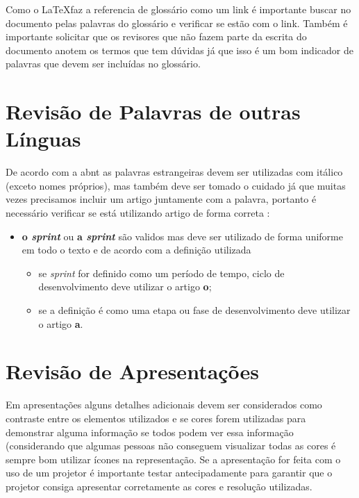 Como o \LaTeX \space faz a referencia de glossário como um link é importante buscar no documento pelas palavras do glossário e verificar se estão com o link. Também é importante solicitar que os revisores que não fazem parte da escrita do documento anotem os termos que tem dúvidas já que isso é um bom indicador de palavras que devem ser incluídas no glossário.


\section{Revisão de Palavras de outras Línguas}
\label{revisao-palavras-estrangeiras}

De acordo com a \ac{abnt} as palavras estrangeiras devem ser utilizadas com itálico (exceto nomes próprios), mas também deve ser tomado o cuidado já que muitas vezes precisamos incluir um artigo juntamente com a palavra, portanto é necessário verificar  se está utilizando artigo de forma correta :

\begin{itemize}
    \item \textbf{o \textit{sprint}} ou \textbf{a \textit{sprint}} são validos mas deve ser utilizado de forma uniforme em todo o texto e de acordo com a definição utilizada 
    \begin{itemize}
        \item se \textit{sprint} for definido como um período de tempo, ciclo de desenvolvimento deve utilizar o artigo \textbf{o};
        
        \item se a definição é como uma etapa ou fase de desenvolvimento deve utilizar o artigo \textbf{a}.
    \end{itemize}
    
\end{itemize}


\section{Revisão de Apresentações}
\label{revisao-apresentacoes}

Em apresentações alguns detalhes adicionais devem ser considerados como contraste entre os elementos utilizados e se cores forem utilizadas para demonstrar alguma informação se todos podem ver essa informação (considerando que algumas pessoas não conseguem visualizar todas as cores é sempre bom utilizar ícones na representação. Se a apresentação for feita com o uso de um projetor é importante testar antecipadamente para garantir que o projetor consiga apresentar corretamente as cores e resolução utilizadas.



